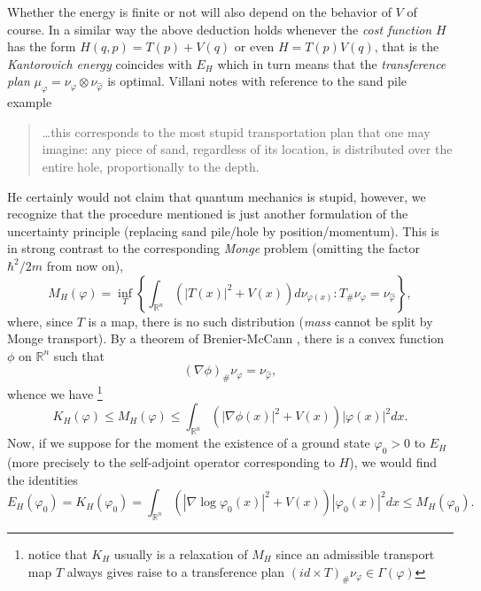 \documentclass[12pt,a4paper,draft]{article}
\newcommand{\RR}[1]{\mathbb{R}^#1}
\begin{document}
%
Whether the energy is finite or not will also depend on the behavior of $V$ of
course. 
In a similar way the above deduction holds whenever the {\sl cost function} $H$
has the form $H(q,p)=T(p)+V(q)$ or even $H=T(p) V(q)$, that is the 
{\sl Kantorovich energy} coincides with $E_H$ which in turn means that the 
{\sl transference plan} $\mu_\varphi=\nu_{\varphi}\otimes\nu_{\hat\varphi}$ 
is optimal. Villani notes with reference to the sand pile example \cite{villani_topics_2003} 
\begin{verse}
    \ldots this corresponds to the most stupid transportation plan that one may 
    imagine: any piece of sand, regardless of its location, is distributed
    over the entire hole, proportionally to the depth.
\end{verse} 
He certainly would not claim that quantum mechanics is stupid, however, we 
recognize that the procedure mentioned is just another formulation of the
uncertainty principle (replacing sand pile/hole by position/momentum). This is in
strong contrast to the corresponding {\sl Monge} problem 
(omitting the factor $\hbar^2/2m$ from now on),
\begin{displaymath}
       M_H(\varphi)=\inf_{T} \left\{\int_{\RR n}
           \left( |T(x)|^2+V(x) \right) d\nu_{\varphi(x)} : 
       T_\# \nu_{\varphi} = \nu_{\hat\varphi}\right\},
\end{displaymath}
where, since $T$ is a map, there is no such distribution ({\sl mass} 
cannot be split by Monge transport). By a theorem of Brenier-McCann \cite{mccann_existence_1995},
there is a convex function $\phi$ on $\RR n$ such that
\begin{displaymath}
                  (\nabla\phi)_{\#}\nu_\varphi = \nu_{\hat\varphi},
\end{displaymath}
whence we have \footnote{notice that $K_H$ usually is a relaxation of $M_H$ since an admissible transport map $T$ always gives raise to a transference plan
$(id\times T)_{\#} \nu_{\varphi}\in\Gamma(\varphi)$} 
\begin{displaymath}
       K_H(\varphi)\leq M_H(\varphi) \leq \int_{\RR n}
           \left( |\nabla\phi(x)|^2+V(x) \right) |\varphi(x)|^2 dx. 
\end{displaymath}
Now, if we suppose for the moment the existence of a ground state $\varphi_0>0$
to $E_H$ (more precisely to the self-adjoint operator corresponding to $H$),
we would find the identities
\begin{displaymath}
    E_H(\varphi_0)=K_H(\varphi_0)= 
       \int_{\RR n}
           \left( |\nabla\log{\varphi_0(x)}|^2+V(x) \right) |\varphi_0(x)|^2 dx
           \leq M_H(\varphi_0). 
\end{displaymath}
\end{document}
